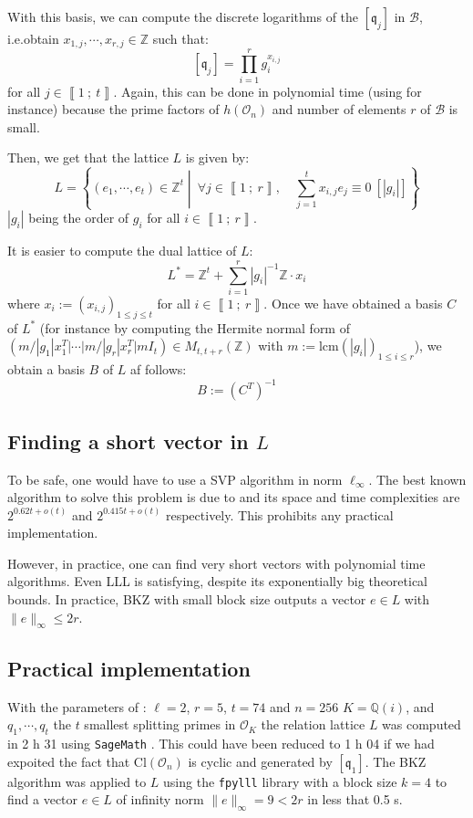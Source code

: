 \documentclass[a4paper,10pt]{article}
\theoremstyle{definition}
\theoremstyle{plain}
\theoremstyle{definition}
\newcommand{\Z}{\mathbb{Z}}
\newcommand{\Q}{\mathbb{Q}}
\newcommand{\m}[1]{\mathcal{#1}}
\newcommand{\mO}{\mathcal{O}}
\renewcommand{\i}[2]{\left\llbracket #1~;~#2\right\rrbracket}
\renewcommand{\(}{\left(}
\renewcommand{\)}{\right)}
\newcommand{\mf}[1]{\mathfrak{#1}}
\begin{document}
With this basis, we can compute the discrete logarithms of the $[\mf{q}_j]$ in $\m{B}$, i.e.obtain $x_{1,j}, \cdots, x_{r, j}\in\Z$ such that:
\[[\mf{q}_j]=\prod_{i=1}^r g_i^{x_{i,j}}\]
for all $j\in\i{1}{t}$. Again, this can be done in polynomial time (using \cite[algorithm 2]{Sutherland2010} for instance) because the prime factors of $h(\mO_n)$ and number of elements $r$ of $\m{B}$ is small. 

Then, we get that the lattice $L$ is given by:
\[L=\left\{(e_1, \cdots, e_t)\in\Z^t\middle|\ \forall j\in\i{1}{r}, \quad \sum_{j=1}^t x_{i,j}e_j\equiv 0 \ [|g_i|]\right\}\]
$|g_i|$ being the order of $g_i$ for all $i\in\i{1}{r}$.  

It is easier to compute the dual lattice of $L$:
\[L^*=\Z^t+\sum_{i=1}^r|g_i|^{-1}\Z\cdot x_i\]
where $x_i:=(x_{i,j})_{1\leq j\leq t}$ for all $i\in\i{1}{r}$.  Once we have obtained a basis $C$ of $L^*$ (for instance by computing the Hermite normal form of $\(m/|g_1|x_1^T|\cdots|m/|g_r|x_r^T|mI_t\)\in M_{t, t+r}(\Z)$ with $m:=\mbox{lcm}(|g_i|)_{1\leq i\leq r}$), we obtain a basis $B$ of $L$ af follows:
\[B:=(C^T)^{-1}\]

\subsection{Finding a short vector in $L$}

To be safe, one would have to use a SVP algorithm in norm $\ell_\infty$.  The best known algorithm to solve this problem is due to \cite{Aggarwal2018} and its space and time complexities are $2^{0.62t+o(t)}$ and $2^{0.415t+o(t)}$ respectively.  This prohibits any practical implementation. 

However, in practice, one can find very short vectors with polynomial time algorithms. Even LLL is satisfying, despite its exponentially big theoretical bounds. In practice, BKZ with small block size outputs a vector $e\in L$ with $\|e\|_\infty\leq 2r$. 

\subsection{Practical implementation}

With the parameters of \cite[p. 28]{OSIDH}: $\ell=2$, $r=5$, $t=74$ and $n=256$ $K=\Q(i)$,  and $q_1,\cdots, q_t$ the $t$ smallest splitting primes in $\mO_K$ the relation lattice $L$ was computed in 2 h 31 using \verb?SageMath? \cite{sagemath}. This could have been reduced to 1 h 04 if we had expoited the fact that $\mbox{Cl}(\mO_n)$ is cyclic and generated by $[\mf{q}_1]$. The BKZ algorithm was applied to $L$ using the \verb?fpylll? library \cite{fpylll} with a block size $k=4$ to find a vector $e\in L$ of infinity norm $\|e\|_\infty=9<2r$ in less that 0.5 s.

\newpage



\end{document}

